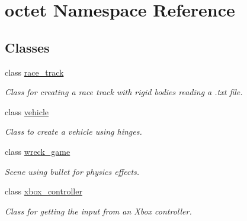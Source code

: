 \hypertarget{namespaceoctet}{\section{octet Namespace Reference}
\label{namespaceoctet}
}
\subsection*{Classes}
\begin{DoxyCompactItemize}
\item 
class \hyperlink{classoctet_1_1race__track}{race\+\_\+track}
\begin{DoxyCompactList}\small\item\em Class for creating a race track with rigid bodies reading a .txt file. \end{DoxyCompactList}\item 
class \hyperlink{classoctet_1_1vehicle}{vehicle}
\begin{DoxyCompactList}\small\item\em Class to create a vehicle using hinges. \end{DoxyCompactList}\item 
class \hyperlink{classoctet_1_1wreck__game}{wreck\+\_\+game}
\begin{DoxyCompactList}\small\item\em Scene using bullet for physics effects. \end{DoxyCompactList}\item 
class \hyperlink{classoctet_1_1xbox__controller}{xbox\+\_\+controller}
\begin{DoxyCompactList}\small\item\em Class for getting the input from an Xbox controller. \end{DoxyCompactList}\end{DoxyCompactItemize}
